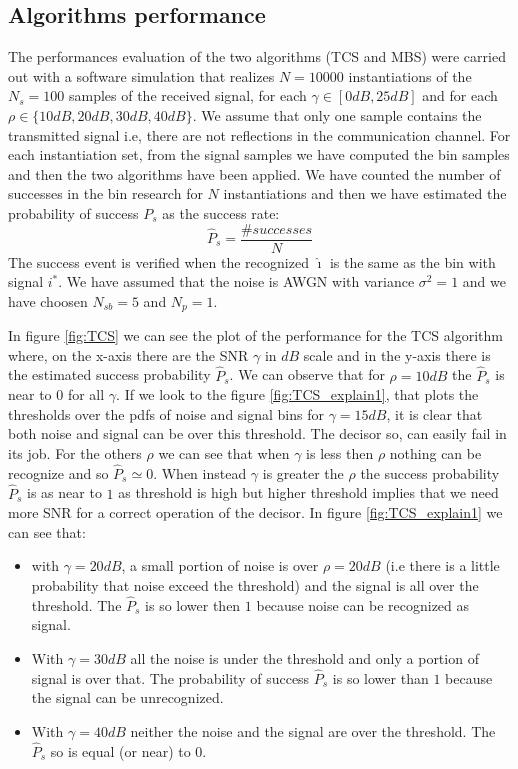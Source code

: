 \documentclass[%
    twoside, 
    a4paper
    ]{article}
\begin{document}
  \subsection{Algorithms performance}
    The performances evaluation of the two algorithms (TCS and MBS) were carried out with a software simulation 
    that realizes $N = 10000$ instantiations of the $N_s = 100$ samples of the received signal, for each 
    $\gamma \in \left[ 0\si{dB}, 25\si{dB} \right]$ and for each $\rho \in \{ 10\si{dB}, 20\si{dB}, 30\si{dB}, 
    40\si{dB} \}$. We assume that 
    only one sample contains the transmitted signal i.e, there are not reflections in the communication channel.
    For each instantiation set, from the signal samples we have computed the bin samples and then the two 
    algorithms have been applied. We have counted the number of successes in the bin research for $N$ instantiations 
    and then we have estimated the probability of success $P_s$ as the success rate:
    \begin{equation}
      \hat{P}_s = \frac{\# successes}{N}
    \end{equation}
    The success event is verified when the recognized $\hat{\imath}$ is the same as the bin with signal $i^*$.
    We have assumed that the noise is AWGN with variance $\sigma^2 = 1$ and we have choosen $N_{sb} = 5$ and 
    $N_p = 1$.

    In figure \ref{fig:TCS} we can see the plot of the performance for the TCS algorithm where, on the \mbox{x-axis}
    there are the SNR $\gamma$ in $\si{dB}$ scale and in the \mbox{y-axis} there is the estimated success probability
    $\hat{P}_s$. We can observe that for $\rho = 10 \si{dB}$ the $\hat{P}_s$ is near to $0$ for all $\gamma$.
    If we look to the figure \ref{fig:TCS_explain1}, that plots the thresholds over the pdfs of noise and 
    signal bins for $\gamma = 15 \si{dB}$, it is clear that both noise and signal can be over this threshold. 
    The decisor so, can easily fail in its job. 
    For the others $\rho$ we can see that when $\gamma$ is less then $\rho$ nothing can be recognize and so 
    $\hat{P}_s \simeq 0$. When instead $\gamma$ is greater the $\rho$ the success probability $\hat{P}_s$ is 
    as near to $1$ as threshold is high but higher threshold implies that we need more SNR for a correct operation
    of the decisor.
    In figure \ref{fig:TCS_explain1} we can see that:
    \begin{itemize}
      \item with $\gamma = 20 \si{dB}$, a small portion of noise is over 
      $\rho = 20 \si{dB}$ (i.e there is a little probability that noise exceed the threshold) and the signal is 
      all over the threshold. The $\hat{P}_s$ is so lower then $1$ because noise can be recognized as signal.
      \item With $\gamma = 30 \si{dB}$ all the noise is under the threshold and only a portion of signal is over that.
      The probability of success $\hat{P}_s$ is so lower than $1$ because the signal can be unrecognized.
      \item With $\gamma = 40 \si{dB}$ neither the noise and the signal are over the threshold. The $\hat{P}_s$ so is 
      equal (or near) to $0$.
    \end{itemize}
\end{document}
